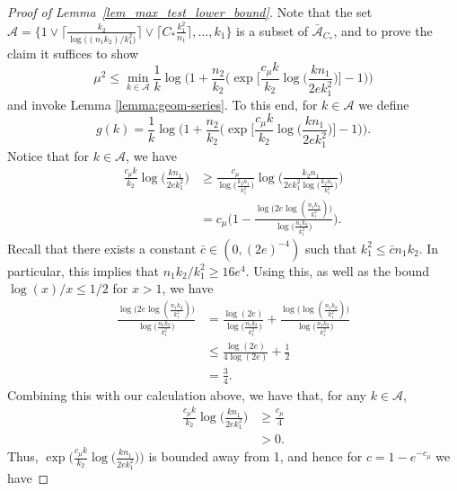 \documentclass{article}
\newcommand{\cA}{\mathcal{A}}
\newcommand{\Ct}{C_{*}}
\begin{document}
\begin{proof}[Proof of Lemma~\ref{lem_max_test_lower_bound}]
     Note that the set $\cA = \{1 \vee \big\lceil \frac{k_2}{\log\big((n_1k_2)/k_1^2\big)}\big\rceil \vee \big\lceil \Ct \frac{k^2_1}{n_1}\big\rceil, ..., k_1\}$ is a subset of $\bar{\cA}_{\Ct}$, and to prove the claim it suffices to show
    \[\mu^2 \leq \min_{k \in \cA}\frac{1}{k}\log\Bigg(1 + \frac{n_2}{k_2}\bigg(\exp\Big[\frac{c_\mu k}{k_2}\log\big(\frac{kn_1}{2ek_1^2}\big)\Big] - 1\bigg)\Bigg)\]
    and invoke Lemma \ref{lemma:geom-series}. To this end, for $k \in \cA$ we define 
    \begin{equation}\label{eq:g}
    g(k) = \frac{1}{k}\log\Bigg(1 + \frac{n_2}{k_2}\bigg(\exp\Big[\frac{c_\mu k}{k_2}\log\big(\frac{kn_1}{2ek_1^2}\big)\Big] - 1\bigg)\Bigg).
    \end{equation}
    Notice that for $k \in \cA$, we have 
    \begin{align*}
        \frac{c_\mu k}{k_2}\log\big(\frac{kn_1}{2ek_1^2}\big) &\geq \frac{c_\mu}{\log\big(\frac{k_2n_1}{k_1^2}\big)}\log\Big(\frac{k_2n_1}{2ek_1^2\log\big(\frac{k_2n_1}{k_1^2}\big)}\Big) \\
        &= c_\mu\Big(1 - \frac{\log\big(2e\log(\frac{n_1k_2}{k_1^2})\big)}{\log\big(\frac{n_1k_2}{k_1^2}\big)}\Big).
    \end{align*}
    Recall that there exists a constant $\bar{c} \in (0, (2e)^{-4})$ such that $k_1^2 \leq \bar{c}n_1k_2$. In particular, this implies that $n_1k_2/k_1^2 \geq 16e^4$. Using this, as well as the bound $\log (x) / x \leq 1/2$ for $x > 1$, we have 
    \begin{align*}
        \frac{\log\big(2e\log(\frac{n_1k_2}{k_1^2})\big)}{\log\big(\frac{n_1k_2}{k_1^2}\big)} &= \frac{\log(2e)}{\log\big(\frac{n_1k_2}{k_1^2}\big)} + \frac{\log\big(\log(\frac{n_1k_2}{k_1^2})\big)}{\log\big(\frac{n_1k_2}{k_1^2}\big)} \\
        &\leq \frac{\log(2e)}{4\log(2e)} + \frac12 \\
        &= \frac34.
    \end{align*}
    Combining this with our calculation above, we have that, for any $k \in \cA$,
    \begin{align*}
        \frac{c_\mu k}{k_2}\log\big(\frac{kn_1}{2ek_1^2}\big) &\geq \frac{c_\mu}{4} \\ 
        &> 0.
    \end{align*}
    Thus, $\exp\big(\frac{c_\mu k}{k_2}\log\big(\frac{kn_1}{2ek_1^2}\big)\big)$ is bounded away from 1, and hence  for $c = 1 - e^{-c_\mu}$ we have

\end{proof}
\end{document}
